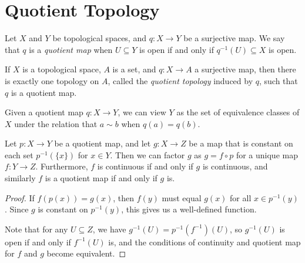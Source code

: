 \section{Quotient Topology}

\begin{defn}
    Let $X$ and $Y$ be topological spaces, and $q: X \to Y$ be a surjective map. We say that $q$ is a \emph{quotient map} when $U \subseteq Y$ is open if and only if $q^{-1}(U) \subseteq X$ is open.
\end{defn}

\begin{defn}
    If $X$ is a topological space, $A$ is a set, and $q: X \to A$ a surjective map, then there is exactly one topology on $A$, called the \emph{quotient topology} induced by $q$, such that $q$ is a quotient map.
\end{defn}

\begin{rmk}
    Given a quotient map $q: X \to Y$, we can view $Y$ as the set of equivalence classes of $X$ under the relation that $a \sim b$ when $q(a) = q(b)$.
\end{rmk}

\begin{thm}
    Let $p: X \to Y$ be a quotient map, and let $g: X \to Z$ be a map that is constant on each set $p^{-1}(\{x\})$ for $x \in Y$. Then we can factor $g$ as $g = f \circ p$ for a unique map $f: Y \to Z$. Furthermore, $f$ is continuous if and only if $g$ is continuous, and similarly $f$ is a quotient map if and only if $g$ is.
\end{thm}

\begin{proof}
    If $f(p(x)) = g(x)$, then $f(y)$ must equal $g(x)$ for all $x \in p^{-1}(y)$. Since $g$ is constant on $p^{-1}(y)$, this gives us a well-defined function.

    Note that for any $U \subseteq Z$, we have $g^{-1}(U) = p^{-1}(f^{-1})(U)$, so $g^{-1}(U)$ is open if and only if $f^{-1}(U)$ is, and the conditions of continuity and quotient map for $f$ and $g$ become equivalent.
\end{proof}
